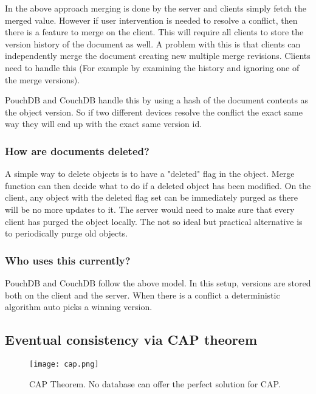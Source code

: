 In the above approach merging is done by the server and clients simply fetch the merged value. 
However if user intervention is needed to resolve a conflict, then there is a feature to merge on the client.
This will require all clients to store the version history of the document as well. A problem with this 
is that clients can independently merge the document creating new multiple merge revisions.
Clients need to handle this (For example by examining the history and ignoring one of the merge versions).

PouchDB and CouchDB handle this by using a hash of the document contents as the object version. So if two 
different devices resolve the conflict the exact same way they will end up with the exact same version id.

\subsubsection*{How are documents deleted?}

A simple way to delete objects is to have a "deleted" flag in the object. 
Merge function can then decide what to do if a deleted object has been modified. 
On the client, any object with the deleted flag set can be immediately purged as 
there will be no more updates to it. The server would need to make sure that every client has purged the object locally. 
The not so ideal but practical alternative is to periodically purge old objects.

\subsubsection*{Who uses this currently?}

PouchDB and CouchDB follow the above model. In this setup, versions are stored both on the client and 
the server. When there is a conflict a deterministic algorithm auto picks a winning version.~\cite{HasuraOfflineFirst}

\subsection{Eventual consistency via CAP theorem}

\begin{figure}[h!]
    \begin{center}
        \texttt{[image: cap.png]}
    \end{center}
    \caption{CAP Theorem. No database can offer the perfect solution for CAP.}
    \label{fig:cap}
\end{figure}

